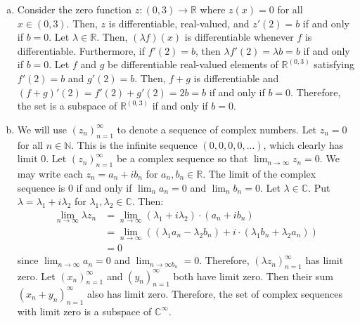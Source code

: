 \documentclass{article}
\begin{document}
\begin{example}
\begin{enumerate}[(a)]
\begin{proof}
      differentiable. Therefore, the set is closed under addition and
      scalar multiplication and has the same additive identity as
      $\mathbb{R}^{\mathbb{R}}$. So, it is a subspace of $\mathbb{R}^{\mathbb{R}}$.
    \end{proof}
  \item
    Consider the zero function $z: (0, 3) \rightarrow
    \mathbb{R}$ where $z(x) = 0$ for all $x \in (0, 3)$. Then, $z$ is
    differentiable, real-valued, and $z'(2) = b$ if and only if $b =
    0$. Let $\lambda \in \mathbb{R}$. Then, $(\lambda f)(x)$ is
    differentiable whenever $f$ is differentiable. Furthermore, if
    $f'(2) = b$, then $\lambda f'(2) = \lambda b = b$ if and only if
    $b = 0$. Let $f$ and $g$ be differentiable real-valued elements of
    $\mathbb{R}^{(0, 3)}$ satisfying $f'(2) = b$ and $g'(2) =
    b$. Then, $f + g$ is differentiable and $(f + g)'(2) = f'(2) +
    g'(2) = 2b = b$ if and only if $b = 0$. Therefore, the set is a
    subspace of $\mathbb{R}^{(0, 3)}$ if and only if $b = 0$.
  \item
    We will use $(z_n)_{n=1}^\infty$ to denote a sequence of complex
    numbers. Let $z_n = 0$ for all $n \in \mathbb{N}$. This is the
    infinite sequence $(0, 0, 0, 0, ...)$, which clearly has limit
    $0$. Let $(z_n)_{n=1}^\infty$ be a complex sequence so that
    $\lim_{n \rightarrow \infty} z_n = 0$. We may write each $z_n =
    a_n + i b_n$ for $a_n, b_n \in \mathbb{R}$. The limit of the
    complex sequence is $0$ if and only if $\lim_n a_n = 0$ and
    $\lim_n b_n = 0$. Let $\lambda \in \mathbb{C}$. Put $\lambda =
    \lambda_1 + i \lambda_2$ for $\lambda_1, \lambda_2 \in
    \mathbb{C}$. Then:
    \begin{align*}
      \lim_{n \rightarrow \infty} \lambda z_n &= \lim_{n \rightarrow
                                                \infty} (\lambda_1 + i
                                                \lambda_2) \cdot (a_n
                                                + i b_n) \\
                                              &= \lim_{n \rightarrow
                                                \infty} ((\lambda_1
                                                a_n - \lambda_2 b_n) +
                                                i \cdot (\lambda_1 b_n
                                                + \lambda_2 a_n)) \\
                                              &= 0
    \end{align*}
    since $\lim_{n \rightarrow \infty} a_n = 0$ and $\lim_{n
      \rightarrow \infty b_n} = 0$. Therefore, $(\lambda
    z_n)_{n=1}^\infty$ has limit zero. Let $(x_n)_{n=1}^\infty$ and
    $(y_n)_{n=1}^\infty$ both have limit zero. Then their sum $(x_n +
    y_n)_{n=1}^\infty$ also has limit zero. Therefore, the set of
    complex sequences with limit zero is a subspace of $\mathbb{C}^\infty$. 
  \end{enumerate}
\end{example}
\end{document}
